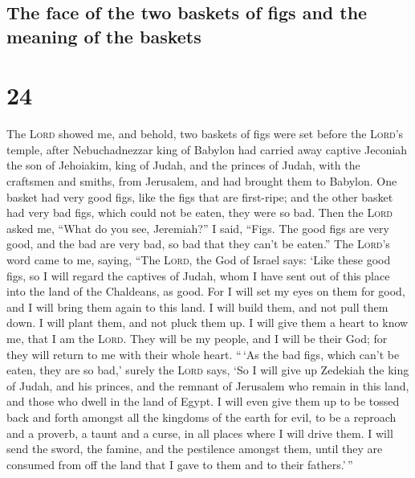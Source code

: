 \hypertarget{the-face-of-the-two-baskets-of-figs-and-the-meaning-of-the-baskets}{%
\subsection{The face of the two baskets of figs and the meaning of the
baskets}\label{the-face-of-the-two-baskets-of-figs-and-the-meaning-of-the-baskets}}

\hypertarget{section-23}{%
\section{24}\label{section-23}}

 The \textsc{Lord} showed me, and behold, two baskets of
figs were set before the \textsc{Lord}'s temple, after Nebuchadnezzar
king of Babylon had carried away captive Jeconiah the son of Jehoiakim,
king of Judah, and the princes of Judah, with the craftsmen and smiths,
from Jerusalem, and had brought them to Babylon.  One
basket had very good figs, like the figs that are first-ripe; and the
other basket had very bad figs, which could not be eaten, they were so
bad.  Then the \textsc{Lord} asked me, ``What do you see,
Jeremiah?'' I said, ``Figs. The good figs are very good, and the bad are
very bad, so bad that they can't be eaten.''  The
\textsc{Lord}'s word came to me, saying,  ``The
\textsc{Lord}, the God of Israel says: `Like these good figs, so I will
regard the captives of Judah, whom I have sent out of this place into
the land of the Chaldeans, as good.  For I will set my
eyes on them for good, and I will bring them again to this land. I will
build them, and not pull them down. I will plant them, and not pluck
them up.  I will give them a heart to know me, that I am
the \textsc{Lord}. They will be my people, and I will be their God; for
they will return to me with their whole heart.  ``\,`As
the bad figs, which can't be eaten, they are so bad,' surely the
\textsc{Lord} says, `So I will give up Zedekiah the king of Judah, and
his princes, and the remnant of Jerusalem who remain in this land, and
those who dwell in the land of Egypt.  I will even give
them up to be tossed back and forth amongst all the kingdoms of the
earth for evil, to be a reproach and a proverb, a taunt and a curse, in
all places where I will drive them.  I will send the
sword, the famine, and the pestilence amongst them, until they are
consumed from off the land that I gave to them and to their
fathers.'\,''

